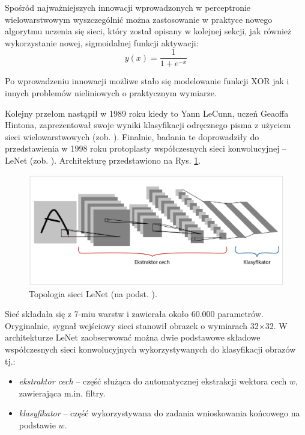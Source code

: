 Spośród najważniejszych innowacji wprowadzonych w perceptronie wielowarstwowym wyszczególnić można zastosowanie w praktyce nowego algorytmu uczenia się sieci, który został opisany w kolejnej sekcji, jak również wykorzystanie nowej, sigmoidalnej funkcji aktywacji:
\begin{equation}
\label{eqSigActFunc}
y(x) = \frac{1}{1 + e^{-x}}
\end{equation}

Po wprowadzeniu innowacji możliwe stało się modelowanie funkcji XOR jak \linebreak i innych problemów nieliniowych o praktycznym wymiarze. 

Kolejny przełom nastąpił w 1989 roku kiedy to Yann LeCunn, uczeń Geaoffa Hintona, zaprezentował swoje wyniki klasyfikacji odręcznego pisma z użyciem sieci wielowarstwowych (zob. \cite{NIPS1989_293}). Finalnie, badania te doprowadziły do przedstawienia w 1998 roku protoplasty współczesnych sieci konwolucyjnej -- LeNet (zob. \cite{Lecun1998}). Architekturę przedstawiono na Rys. \ref{LeNet}.
\begin{figure}[h!]
	\centering
	\includegraphics[width=1\textwidth]{figures/lenet.png}
	\caption{Topologia sieci LeNet (na podst. \cite{Lecun1998}).}
	\label{LeNet}
\end{figure}

Sieć składała się z 7-miu warstw i zawierała około 60.000 parametrów. Oryginalnie, sygnał wejściowy sieci stanowił obrazek o wymiarach 32$\times$32. W architekturze LeNet zaobserwować można dwie podstawowe składowe współczesnych sieci konwolucyjnych wykorzystywanych do klasyfikacji obrazów tj.:
\begin{itemize}[noitemsep,nolistsep]
	\item \textit{ekstraktor cech} -- część służąca do automatycznej ekstrakcji wektora cech \linebreak $w$, zawierająca m.in. filtry.
	\item \textit{klasyfikator} -- część wykorzystywana do zadania wnioskowania końcowego \linebreak na podstawie $w$.
\end{itemize}  

